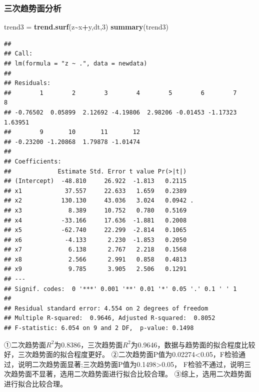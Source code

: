 \documentclass[
]{article}
\newenvironment{Shaded}{\begin{snugshade}}{\end{snugshade}}
\newcommand{\DecValTok}[1]{\textcolor[rgb]{0.00,0.00,0.81}{#1}}
\newcommand{\FunctionTok}[1]{\textcolor[rgb]{0.13,0.29,0.53}{\textbf{#1}}}
\newcommand{\NormalTok}[1]{#1}
\newcommand{\OtherTok}[1]{\textcolor[rgb]{0.56,0.35,0.01}{#1}}
\newcommand{\SpecialCharTok}[1]{\textcolor[rgb]{0.81,0.36,0.00}{\textbf{#1}}}
\begin{document}
\subsubsection{三次趋势面分析}\label{ux4e09ux6b21ux8d8bux52bfux9762ux5206ux6790}

\begin{Shaded}
\begin{Highlighting}[]
\NormalTok{trend3 }\OtherTok{=} \FunctionTok{trend.surf}\NormalTok{(z}\SpecialCharTok{\textasciitilde{}}\NormalTok{x}\SpecialCharTok{+}\NormalTok{y,dt,}\DecValTok{3}\NormalTok{)}
\FunctionTok{summary}\NormalTok{(trend3)}
\end{Highlighting}
\end{Shaded}

\begin{verbatim}
## 
## Call:
## lm(formula = "z ~ .", data = newdata)
## 
## Residuals:
##        1        2        3        4        5        6        7        8 
## -0.76502  0.05899  2.12692 -4.19806  2.98206 -0.01453 -1.17323  1.63951 
##        9       10       11       12 
## -0.23200 -1.20868  1.79878 -1.01474 
## 
## Coefficients:
##             Estimate Std. Error t value Pr(>|t|)  
## (Intercept)  -48.810     26.922  -1.813   0.2115  
## x1            37.557     22.633   1.659   0.2389  
## x2           130.130     43.036   3.024   0.0942 .
## x3             8.389     10.752   0.780   0.5169  
## x4           -33.166     17.636  -1.881   0.2008  
## x5           -62.740     22.299  -2.814   0.1065  
## x6            -4.133      2.230  -1.853   0.2050  
## x7             6.138      2.767   2.218   0.1568  
## x8             2.566      2.991   0.858   0.4813  
## x9             9.785      3.905   2.506   0.1291  
## ---
## Signif. codes:  0 '***' 0.001 '**' 0.01 '*' 0.05 '.' 0.1 ' ' 1
## 
## Residual standard error: 4.554 on 2 degrees of freedom
## Multiple R-squared:  0.9646, Adjusted R-squared:  0.8052 
## F-statistic: 6.054 on 9 and 2 DF,  p-value: 0.1498
\end{verbatim}

①二次趋势面\(R^2\)为0.8386，三次趋势面\(R^2\)为0.9646，数据与趋势面的拟合程度比较好，三次趋势面的拟合程度更好。
②二次趋势面P值为0.02274\textless0.05，F检验通过，说明二次趋势面显著;三次趋势面P值为0.1498\textgreater0.05，
F检验不通过，说明三次趋势面不显著，选用二次趋势面进行拟合比较合理。
③综上，选用二次趋势面进行拟合比较合理。
\end{document}
